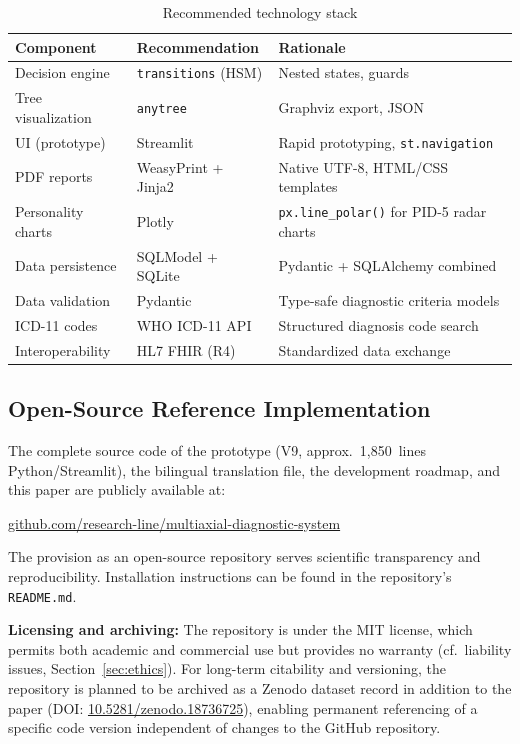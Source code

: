\documentclass[11pt,a4paper]{article}
\begin{document}
\begin{table}[H]
\centering
\caption{Recommended technology stack}
\label{tab:techstack}
\begin{tabularx}{\textwidth}{lXl}
\toprule
\textbf{Component} & \textbf{Recommendation} & \textbf{Rationale} \\
\midrule
Decision engine & \texttt{transitions} (HSM) & Nested states, guards \\
Tree visualization & \texttt{anytree} & Graphviz export, JSON \\
UI (prototype) & Streamlit & Rapid prototyping, \texttt{st.navigation} \\
PDF reports & WeasyPrint + Jinja2 & Native UTF-8, HTML/CSS templates \\
Personality charts & Plotly & \texttt{px.line\_polar()} for PID-5 radar charts \\
Data persistence & SQLModel + SQLite & Pydantic + SQLAlchemy combined \\
Data validation & Pydantic & Type-safe diagnostic criteria models \\
ICD-11 codes & WHO ICD-11 API & Structured diagnosis code search \\
Interoperability & HL7 FHIR (R4) & Standardized data exchange \\
\bottomrule
\end{tabularx}
\end{table}

\subsection{Open-Source Reference Implementation}

The complete source code of the prototype (V9, approx.\ 1,850~lines Python/Streamlit), the bilingual translation file, the development roadmap, and this paper are publicly available at:

\begin{center}
\href{https://github.com/research-line/multiaxial-diagnostic-system}{github.com/research-line/multiaxial-diagnostic-system}
\end{center}

\noindent The provision as an open-source repository serves scientific transparency and reproducibility. Installation instructions can be found in the repository's \texttt{README.md}.

\textbf{Licensing and archiving:} The repository is under the MIT license, which permits both academic and commercial use but provides no warranty (cf.\ liability issues, Section~\ref{sec:ethics}). For long-term citability and versioning, the repository is planned to be archived as a Zenodo dataset record in addition to the paper (DOI: \href{https://doi.org/10.5281/zenodo.18736725}{10.5281/zenodo.18736725}), enabling permanent referencing of a specific code version independent of changes to the GitHub repository.
\end{document}
